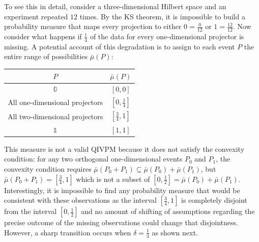\documentclass[english,reprint, aps, prl,superscriptaddress, showpacs,
showkeys, longbibliography, amsmath, amssymb, floatfix]{revtex4-1}
\theoremstyle{plain}
\theoremstyle{definition}
\newcommand{\imposs}{\ensuremath{\left[0,0\right]}}
\newcommand{\necess}{\ensuremath{\left[1,1\right]}}
\begin{document}
To see this in detail, consider a three-dimensional Hilbert space and
an experiment repeated $12$ times. By the KS theorem, it is impossible
to build a probability measure that maps every projection to either
$0=\frac{0}{12}$ or $1=\frac{12}{12}$. Now consider what happens if
$\frac{1}{4}$ of the data for every one-dimensional projector is
missing. A potential account of this degradation is to assign to each
event $P$ the entire range of possibilities $\bar{\mu}(P)$:
\begin{center}
\begin{tabular}{cc}
\toprule 
\addlinespace
$P$  & $\bar{\mu}\left(P\right)$\tabularnewline
\midrule
\midrule 
\addlinespace
$\mathbb{0}$ & $\imposs$\tabularnewline
\midrule 
\addlinespace
All one-dimensional projectors & $\left[0,\tfrac{1}{4}\right]$\tabularnewline
\midrule 
\addlinespace
All two-dimensional projectors & $\left[\tfrac{3}{4},1\right]$\tabularnewline
\midrule 
\addlinespace
$\mathbb{1}$ & $\necess$\tabularnewline
\bottomrule
\end{tabular}
\par\end{center}

\noindent This measure is not a valid QIVPM because it does not
satisfy the convexity condition: for any two orthogonal
one-dimensional events $P_{0}$ and $P_{1}$, the convexity condition
requires
$\bar{\mu}\left(P_{0}+P_{1}\right)\subseteq\bar{\mu}\left(P_{0}\right)+\bar{\mu}\left(P_{1}\right)$,
but $\bar{\mu}\left(P_{0}+P_{1}\right)=\left[\tfrac{3}{4},1\right]$
which is not a subset of
$\left[0,\tfrac{1}{2}\right]=\bar{\mu}\left(P_{0}\right)+\bar{\mu}\left(P_{1}\right)$. Interestingly,
it is impossible to find any probability measure that would be
consistent with these observations as the interval
$\left[\tfrac{3}{4},1\right]$ is completely disjoint from the interval
$\left[0,\tfrac{1}{2}\right]$ and no amount of shifting of assumptions
regarding the precise outcome of the missing observations could change
that disjointness. However, a sharp transition occurs when
$\delta=\tfrac{1}{3}$ as shown next. 

\end{document}
